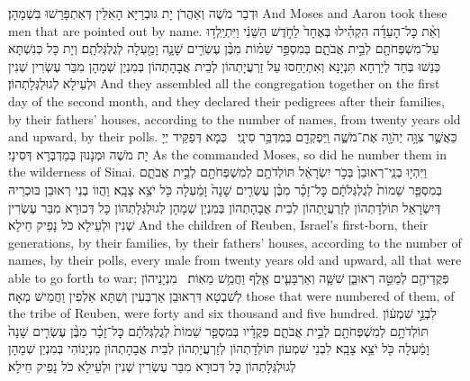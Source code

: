 {וּדְבַר מֹשֶׁה וְאַהֲרֹן יָת גּוּבְרַיָּא הָאִלֵּין דְּאִתְפָּרַשׁוּ בִּשְׁמָהָן׃}
{And Moses and Aaron took these men that are pointed out by name.}{}
{וְאֵ֨ת כׇּל־הָעֵדָ֜ה הִקְהִ֗ילוּ בְּאֶחָד֙ לַחֹ֣דֶשׁ הַשֵּׁנִ֔י וַיִּתְיַֽלְד֥וּ עַל־מִשְׁפְּחֹתָ֖ם לְבֵ֣ית אֲבֹתָ֑ם בְּמִסְפַּ֣ר שֵׁמ֗וֹת מִבֶּ֨ן עֶשְׂרִ֥ים שָׁנָ֛ה וָמַ֖עְלָה לְגֻלְגְּלֹתָֽם׃
}
{וְיָת כָּל כְּנִשְׁתָּא כְּנַשׁוּ בְּחַד לְיַרְחָא תִּנְיָנָא וְאִתְיַחַסוּ עַל זַרְעֲיָתְהוֹן לְבֵית אֲבָהָתְהוֹן בְּמִנְיַן שְׁמָהָן מִבַּר עֶשְׂרִין שְׁנִין וּלְעֵילָא לְגוּלְגְּלָתְהוֹן׃}
{And they assembled all the congregation together on the first day of the second month, and they declared their pedigrees after their families, by their fathers’ houses, according to the number of names, from twenty years old and upward, by their polls.}{}
{כַּאֲשֶׁ֛ר צִוָּ֥ה יְהֹוָ֖ה אֶת־מֹשֶׁ֑ה וַֽיִּפְקְדֵ֖ם בְּמִדְבַּ֥ר סִינָֽי׃ \setuma }
{כְּמָא דְּפַקֵּיד יְיָ יָת מֹשֶׁה וּמְנָנוּן בְּמַדְבְּרָא דְּסִינָי׃}
{As the \lord\space commanded Moses, so did he number them in the wilderness of Sinai.}{}
{וַיִּהְי֤וּ בְנֵֽי־רְאוּבֵן֙ בְּכֹ֣ר יִשְׂרָאֵ֔ל תּוֹלְדֹתָ֥ם לְמִשְׁפְּחֹתָ֖ם לְבֵ֣ית אֲבֹתָ֑ם בְּמִסְפַּ֤ר שֵׁמוֹת֙ לְגֻלְגְּלֹתָ֔ם כׇּל־זָכָ֗ר מִבֶּ֨ן עֶשְׂרִ֤ים שָׁנָה֙ וָמַ֔עְלָה כֹּ֖ל יֹצֵ֥א צָבָֽא׃}
{וַהֲווֹ בְנֵי רְאוּבֵן בּוּכְרֵיהּ דְּיִשְׂרָאֵל תּוֹלְדָתְהוֹן לְזַרְעֲיָתְהוֹן לְבֵית אֲבָהָתְהוֹן בְּמִנְיַן שְׁמָהָן לְגוּלְגְּלָתְהוֹן כָּל דְּכוּרָא מִבַּר עֶשְׂרִין שְׁנִין וּלְעֵילָא כֹּל נָפֵיק חֵילָא׃}
{And the children of Reuben, Israel’s first-born, their generations, by their families, by their fathers’ houses, according to the number of names, by their polls, every male from twenty years old and upward, all that were able to go forth to war;}{}
{פְּקֻדֵיהֶ֖ם לְמַטֵּ֣ה רְאוּבֵ֑ן שִׁשָּׁ֧ה וְאַרְבָּעִ֛ים אֶ֖לֶף וַחֲמֵ֥שׁ מֵאֽוֹת׃ \petucha }
{מִנְיָנֵיהוֹן לְשִׁבְטָא דִּרְאוּבֵן אַרְבְּעִין וְשִׁתָּא אַלְפִין וַחֲמֵישׁ מְאָה׃}
{those that were numbered of them, of the tribe of Reuben, were forty and six thousand and five hundred.}{}
{לִבְנֵ֣י שִׁמְע֔וֹן תּוֹלְדֹתָ֥ם לְמִשְׁפְּחֹתָ֖ם לְבֵ֣ית אֲבֹתָ֑ם פְּקֻדָ֗יו בְּמִסְפַּ֤ר שֵׁמוֹת֙ לְגֻלְגְּלֹתָ֔ם כׇּל־זָכָ֗ר מִבֶּ֨ן עֶשְׂרִ֤ים שָׁנָה֙ וָמַ֔עְלָה כֹּ֖ל יֹצֵ֥א צָבָֽא׃}
{לִבְנֵי שִׁמְעוֹן תּוֹלְדָתְהוֹן לְזַרְעֲיָתְהוֹן לְבֵית אֲבָהָתְהוֹן מִנְיָנוֹהִי בְּמִנְיַן שְׁמָהָן לְגוּלְגְּלָתְהוֹן כָּל דְּכוּרָא מִבַּר עֶשְׂרִין שְׁנִין וּלְעֵילָא כֹּל נָפֵיק חֵילָא׃}
